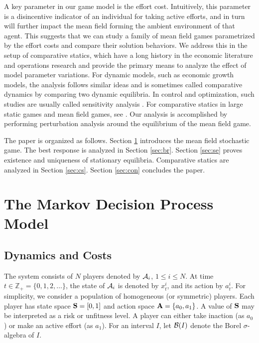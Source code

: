 \documentclass[graybox]{svmult}
\begin{document}
A key parameter in our game model is the effort cost. Intuitively, this parameter is a disincentive indicator of an individual for taking active efforts, and in turn will further impact the mean field forming the ambient environment of that agent. This suggests that we can study a family of mean field games parametrized by the effort costs and compare their solution behaviors.
We  address this in the setup of comparative statics, which have a long history in the economic literature   \cite{H39,MS94,S83} and operations research \cite{T98} and provide the primary means to analyze the effect of model parameter variations. For dynamic models, such as economic growth models, the analysis follows similar ideas and  is sometimes  called comparative dynamics \cite{A96,B85,O73,S83}  by comparing two dynamic equilibria. In control and optimization, such studies are usually called sensitivity analysis \cite{BS00,D63,IK92}. For comparative statics in large static  games and  mean field games, see \cite{AJ13,AJ15}.
Our analysis is accomplished by performing perturbation analysis around the equilibrium of the mean field game.

The paper is organized as follows. Section \ref{sec:mean} introduces the mean field stochastic game. The best response is analyzed in Section \ref{sec:br}.
 Section \ref{sec:se} proves existence and uniqueness of stationary  equilibria.
Comparative statics are analyzed in Section \ref{sec:cs}.
 Section \ref{sec:con} concludes the paper.




\section{The  Markov Decision Process Model}
\label{sec:mean}

\subsection{Dynamics and Costs}

The system consists of $N$  players
denoted by ${\cal A}_i$, $1\le i\le N$.
At time $t\in \mathbb{Z}_+=\{0, 1,2, \ldots\}$, the state of ${\cal A}_i$ is denoted by $x_t^i$, and its action by $a_t^i$.
For simplicity, we consider a population of homogeneous (or symmetric) players.
Each player has  state space ${\bf S}=[0,1]$ and action space  ${\bf A}=\{a_0, a_1\}$.  A value of ${\bf S}$ may be interpreted as a risk or unfitness level.
A player can either
 take inaction (as $a_0$) or
 make an active effort (as $a_1$).
  For an interval $I$, let ${\cal B}(I)$ denote the Borel $\sigma$-algebra of $I$.
\end{document}
